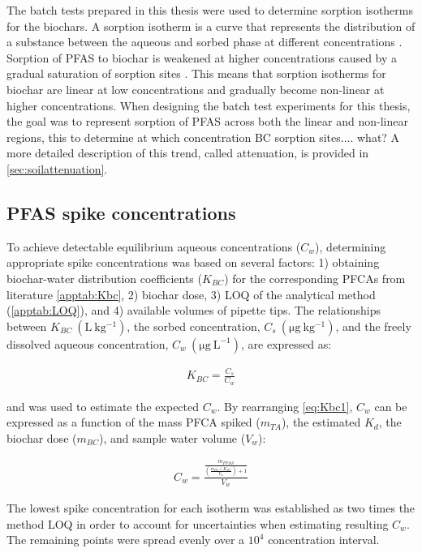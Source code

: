 The batch tests prepared in this thesis were used to determine sorption isotherms for the biochars. A sorption isotherm is a curve that represents the distribution of a substance between the aqueous and sorbed phase at different concentrations \citep{limousin2007sorption}. Sorption of PFAS to biochar is weakened at higher concentrations caused by a gradual saturation of sorption sites \citep{schwarzenbach2005environmental}. This means that sorption isotherms for biochar are linear at low concentrations and gradually become non-linear at higher concentrations. When designing the batch test experiments for this thesis, the goal was to represent sorption of PFAS across both the linear and non-linear regions, this to determine at which concentration BC sorption sites.... what?  A more detailed description of this trend, called attenuation, is provided in \cref{sec:soilattenuation}. 

\subsection{PFAS spike concentrations}
To achieve detectable equilibrium aqueous concentrations ($C_w$), determining appropriate spike concentrations was based on several factors: 1) obtaining biochar-water distribution coefficients ($K_{BC}$) for the corresponding PFCAs from literature \cite{Xiao2017} \cref{apptab:Kbc}, 2) biochar dose, 3) LOQ of the analytical method (\cref{apptab:LOQ}), and 4) available volumes of pipette tips. The relationships between $K_{BC}~\mathrm{(L~kg^{-1})}$, the sorbed concentration, $C_s~\mathrm{(\mu g~kg^{-1})}$, and the freely dissolved aqueous concentration, $C_w~\mathrm{(\mu g~L^{-1})}$, are expressed as:

\begin{align}
    \label{eq:Kbc1}
    K_{BC} = \frac{C_s}{C_w}
\end{align}

and was used to estimate the expected $C_w$. By rearranging \cref{eq:Kbc1}, $C_w$ can be expressed as a function of the mass PFCA spiked ($m_{TA}$), the estimated $K_d$, the biochar dose ($m_{BC}$), and sample water volume ($V_w$):

\begin{align}
    \label{eq:Cw2}
    C_w=\frac{\frac{m_{PFAS}}{\left (\frac{m_{BC}\times K_{BC}}{V_w}\right)+1}}{V_w}
\end{align}

The lowest spike concentration for each isotherm was established as two times the method LOQ in order to account for uncertainties when estimating resulting $C_w$. The remaining points were spread evenly over a $10^4$ concentration interval. 


